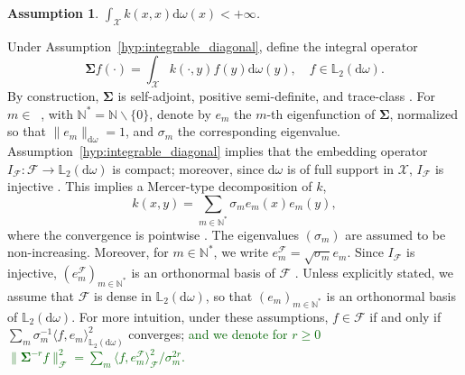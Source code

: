 \documentclass[twoside,11pt]{book}
\newcommand{\rev}[1]{\textcolor{darkgreen}{#1}}
\newtheorem{assumption}{Assumption}
\numberwithin{theorem}{chapter}
\numberwithin{definition}{chapter}
\numberwithin{proposition}{chapter}
\numberwithin{corollary}{chapter}
\numberwithin{example}{chapter}
\numberwithin{lemma}{chapter}
\numberwithin{assumption}{chapter}
\DeclareMathOperator{\Span}{\mathrm{Span}}
\DeclareMathOperator{\X}{\mathcal{X}}
\DeclareMathOperator{\Ns}{\mathbb{N}^{*}}
\newcommand{\rb}[1]{\textcolor{magenta}{#1}}
\begin{document}

\begin{assumption}\label{CVS_hyp:integrable_diagonal}
$\displaystyle \int_{\X} k(x,x) \mathrm{d}\omega(x) < +\infty$.
\end{assumption}
Under Assumption~\ref{hyp:integrable_diagonal}, define the integral operator
\begin{equation}
\bm{\Sigma} f (\cdot) = \int_{\mathcal{X}} k(\cdot,y)f(y) \mathrm{d}\omega(y), \quad f \in \mathbb{L}_{2}(\mathrm{d}\omega).
\end{equation}
By construction, $\bm{\Sigma}$ is self-adjoint, positive semi-definite, and trace-class \citep{Sim05}.
%
For $m \in \Ns$, with $\mathbb{N}^{*} = \mathbb{N} \smallsetminus \{0\}$, denote by $e_{m}$ the $m$-th eigenfunction of $\bm{\Sigma}$, normalized so that $\|e_{m}\|_{\mathrm{d}\omega} = 1$, and $\sigma_{m}$ the corresponding eigenvalue. Assumption~\ref{hyp:integrable_diagonal} implies that the embedding operator $I_{\mathcal{F}}: \mathcal{F} \longrightarrow \mathbb{L}_{2}(\mathrm{d}\omega)$ is compact; moreover, since $\mathrm{d}\omega$ is of full support in $\mathcal{X}$, $I_{\mathcal{F}}$ is injective \citep{StCh08}. This implies a Mercer-type decomposition of $k$,
\begin{equation}
\label{CVS_eq:Mercer_decomp}
	k(x,y)= \sum\limits_{m \in \mathbb{N}^{*}}\sigma_{m}e_{m}(x)e_{m}(y),
\end{equation}
where the convergence is pointwise \citep{StSc12}. The eigenvalues $(\sigma_m)$ are assumed to be non-increasing. Moreover, for $m \in \mathbb{N}^{*}$, we write $e_{m}^{\mathcal{F}} = \sqrt{\sigma_{m}}e_{m}$. Since $I_{\mathcal{F}}$ is injective, $(e_{m}^{\mathcal{F}})_{m \in \mathbb{N}^{*}}$ is an orthonormal basis of $\mathcal{F}$ \citep{StSc12}. Unless explicitly stated, we assume that $\mathcal{F}$ is dense in $\mathbb{L}_{2}(\mathrm{d}\omega)$, so that $(e_{m})_{m \in \mathbb{N}^{*}}$ is an orthonormal basis of $\mathbb{L}_{2}(\mathrm{d}\omega)$. For more intuition, under these assumptions, $f \in \mathcal{F}$ if and only if $\sum_m \sigma_{m}^{-1} \langle f,e_{m} \rangle_{\mathbb{L}_{2}(\mathrm{d} \omega)}^{2}$ converges; \rev{ and we denote for $r\geq 0$ $\|\bm{\Sigma}^{-r}f\|_{\mathcal{F}}^{2} = \sum_{m} \langle f,e_{m}^{\mathcal{F}} \rangle_{\mathcal{F}}^{2}/\sigma_{m}^{2r}$.}
\end{document}
